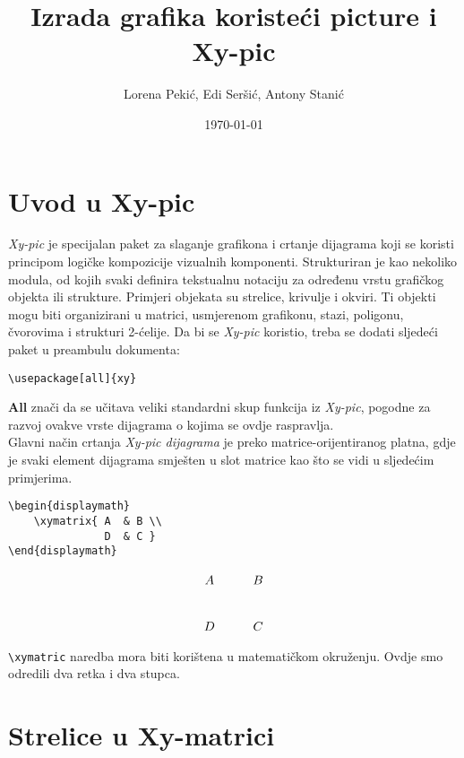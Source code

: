 \documentclass{beamer}
\title{Izrada grafika koristeći picture i Xy-pic}
\author{Lorena Pekić, Edi Seršić, Antony Stanić}
\date{\today}
\begin{document}
\maketitle


\newpage

\section{Uvod u Xy-pic}

\textit{Xy-pic} je specijalan paket za slaganje grafikona i crtanje dijagrama koji se koristi principom logičke kompozicije vizualnih komponenti. Strukturiran je kao nekoliko modula, od kojih svaki definira tekstualnu notaciju za određenu vrstu grafičkog objekta ili strukture. Primjeri objekata su strelice, krivulje i okviri. Ti objekti mogu biti organizirani u matrici, usmjerenom grafikonu, stazi, poligonu, čvorovima i strukturi 2-ćelije. Da bi se \textit{Xy-pic} koristio, treba se dodati sljedeći paket u preambulu dokumenta:

\begin{verbatim}
\usepackage[all]{xy}
\end{verbatim}

\justify
\textbf{All} znači da se učitava veliki standardni skup funkcija iz \textit{Xy-pic}, pogodne za razvoj ovakve vrste dijagrama o kojima se ovdje raspravlja. \\
Glavni način crtanja \textit{Xy-pic dijagrama} je preko matrice-orijentiranog platna, gdje je svaki element dijagrama smješten u slot matrice kao što se vidi u sljedećim primjerima. \\

\begin{center}
\begin{verbatim}
\begin{displaymath}
    \xymatrix{ A  & B \\
               D  & C }
\end{displaymath}
\end{verbatim}

\begin{displaymath}
    \xymatrix{ A  & B \\
               D  & C  }
\end{displaymath}
\end{center}
\justify
\verb|\xymatric| naredba mora biti korištena u matematičkom okruženju. Ovdje smo odredili dva retka i dva stupca.
\newpage

\section{Strelice u Xy-matrici}
\end{document}
